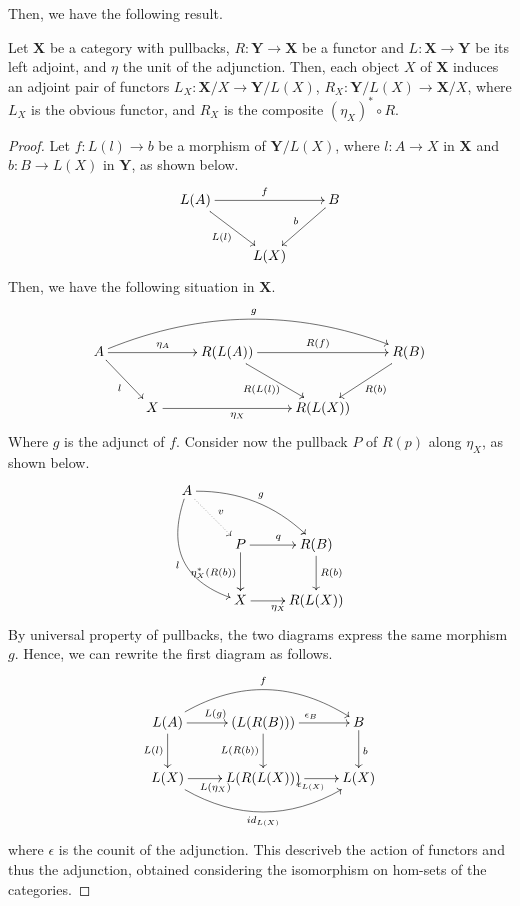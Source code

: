 \documentclass[a4paper,UKenglish,cleveref,pdftex,thm-restate,numberwithinsect]{lipics-v2021}
\newcommand{\cat}[1]{\ensuremath{\mathbf{#1}}}
\newcommand{\id}[1]{\mathsf{id}_{#1}}
\begin{document}
Then, we have the following result.

\begin{proposition}
	Let $\cat X$ be a category with pullbacks, $R: \cat{Y \to X}$ be a functor and $L: \cat{X \to Y}$ be its left adjoint, and $\eta$ the unit of the adjunction.
	Then, each object $X$ of $\cat X$ induces an adjoint pair of functors $L_X: \cat X/X \to \cat Y/L(X)$, $R_X: \cat Y/L(X) \to \cat X/X$, 
	where $L_X$ is the obvious functor, and $R_X$ is the composite $(\eta_X)^* \circ R$.
\end{proposition}

\begin{proof}
	Let $f: L(l) \to b$ be a morphism of $\cat Y/L(X)$, where $l: A \to X$ in $\cat X$ and $b: B \to L(X)$ in $\cat Y$, as shown below.
	\[\xymatrix{L(A)\ar[rr]^{f}\ar[dr]_{L(l)}&&B\ar[dl]_{b}\\&L(X)}\]
	Then, we have the following situation in $\cat X$.
	\[\xymatrix{
			A \ar[rr]^{\eta_A}\ar[dr]_{l} \ar@/^2.0pc/@[black][rrrr]^{g} && R(L(A)) \ar[rr]^{R(f)} \ar[dr]_{R(L(l))} && R(B) \ar[dl]^{R(b)}\\
						      & X \ar[rr]_{\eta_X} && R(L(X))
	}\]
	Where $g$ is the adjunct of $f$.
	Consider now the pullback $P$ of $R(p)$ along $\eta_X$, as shown below.
	\[\xymatrix{
		A \ar@/^1.0pc/[drr]^{g}\ar@/_2.0pc/[ddr]_{l} \ar@{.>}[dr]^{v}\\&P\ar[r]^{q}\ar[d]_{\eta_X^*(R(b))}&R(B)\ar[d]^{R(b)}\\&X \ar[r]_{\eta_X}&R(L(X))
	}\]
	By universal property of pullbacks, the two diagrams express the same morphism $g$.
	Hence, we can rewrite the first diagram as follows.
	\[\xymatrix{
			L(A)\ar[r]^{L(g)}\ar[d]_{L(l)}\ar@/^2.0pc/[rr]^{f}&(L(R(B)))\ar[d]_{L(R(b))}\ar[r]^{\epsilon_B}&B\ar[d]^{b}\\
			L(X)\ar[r]_{L(\eta_X)}\ar@/_2.0pc/[rr]_{\id{L(X)}}&L(R(L(X)))\ar[r]_{\epsilon_{L(X)}}& L(X)
	}\]
	where $\epsilon$ is the counit of the adjunction.
	This descriveb the action of functors and thus the adjunction, obtained considering the isomorphism on hom-sets of the categories.

\end{proof}
\fi

\end{document}
